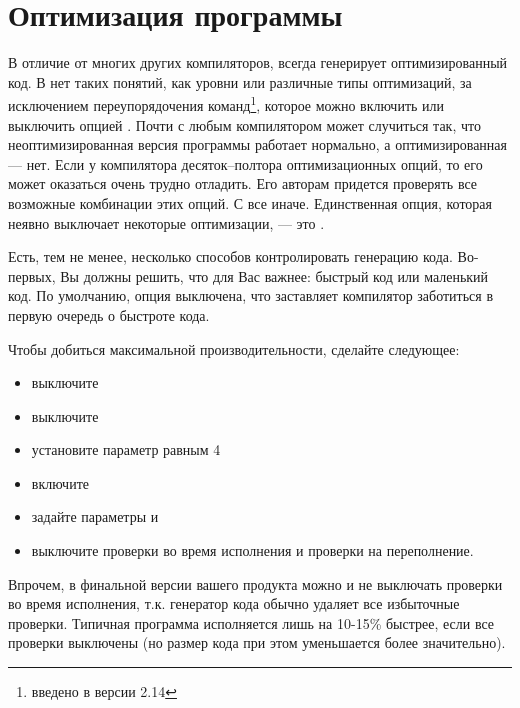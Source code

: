 \ifgencode
\section{Оптимизация программы}\label{start:optim}


В отличие от многих других компиляторов, \XDS{} 
всегда генерирует оптимизированный код. 
В \XDS{} нет таких понятий, как уровни или различные типы оптимизаций,
за исключением переупорядочения команд\footnote{введено в версии 2.14}, %
которое можно включить или выключить опцией .
Почти с любым компилятором может случиться так, что неоптимизированная
версия программы работает нормально, а оптимизированная --- нет.
Если у компилятора десяток--полтора оптимизационных опций, то его может
оказаться очень трудно отладить. Его авторам придется проверять все
возможные комбинации этих опций.
С \XDS{} все иначе.
Единственная опция, которая неявно выключает некоторые 
оптимизации, --- это .

Есть, тем не менее, несколько способов контролировать генерацию кода.
Во-первых, Вы должны решить, что для Вас важнее: быстрый код или 
маленький код.
По умолчанию, опция  выключена,
что заставляет компилятор заботиться в первую очередь о быстроте кода.

Чтобы добиться максимальной производительности, сделайте следующее:
\begin{itemize}
\item выключите              %
\item выключите  
\iflinux \else %
\item установите параметр  равным 4
\fi
\item включите  
\item задайте параметры  и 
\item выключите проверки во время исполнения и проверки на переполнение.
\end{itemize}
Впрочем, в финальной версии вашего продукта можно и не выключать
проверки во время исполнения, т.к. генератор кода обычно удаляет все 
избыточные проверки. Типичная программа исполняется лишь на 
10-15\% быстрее, если все проверки выключены (но размер кода при этом
уменьшается более значительно).

